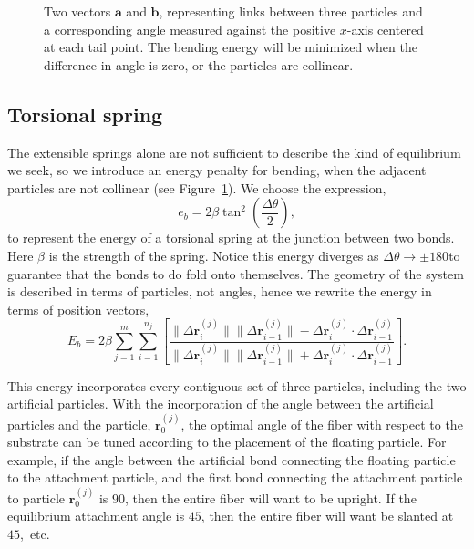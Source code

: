 	\begin{figure}
		\begin{center}
			
		\end{center}		
		\caption{Two vectors $\textbf{a}$ and $\textbf{b}$, representing links between three particles and a corresponding angle measured against the positive $x$-axis centered at each tail point. The bending energy will be minimized when the difference in angle is zero, or the particles are collinear.
		\label{fig:BendingEnergy}}
	\end{figure}	

\subsection{Torsional spring}

	The extensible springs alone are not sufficient to describe the kind of equilibrium we seek, so we introduce an energy penalty for bending, when the adjacent particles are not collinear (see Figure~\ref{fig:BendingEnergy}). We choose the expression,
\begin{equation}
	e_b = 2\beta \tan^2 \left( \frac{\Delta \theta}{2} \right),
\end{equation}
to represent the energy of a torsional spring at the junction between two bonds. Here $\beta$ is the strength of the spring. Notice this energy diverges as $\Delta \theta \to \pm180$\textdegree to guarantee that the bonds to do fold onto themselves. The geometry of the system is described in terms of particles, not angles, hence we rewrite the energy in terms of position vectors,
\begin{equation}
	E_b = 2\beta \sum_{j=1}^m \sum_{i=1}^{n_j} \left[ \frac{\|\Delta \textbf{r}_i^{(j)} \| \|\Delta \textbf{r}_{i-1}^{(j)} \| - \Delta \textbf{r}_i^{(j)} \cdot \Delta \textbf{r}_{i-1}^{(j)}}{\|\Delta \textbf{r}_i^{(j)} \| \|\Delta \textbf{r}_{i-1}^{(j)} \| + \Delta \textbf{r}_i^{(j)} \cdot \Delta \textbf{r}_{i-1}^{(j)}} \right].
\end{equation}

	This energy incorporates every contiguous set of three particles, including the two artificial particles. With the incorporation of the angle between the artificial particles and the particle, $\textbf{r}_0^{(j)}$, the optimal angle of the fiber with respect to the substrate can be tuned according to the placement of the floating particle. For example, if the angle between the artificial bond connecting the floating particle to the attachment particle, and the first bond connecting the attachment particle to particle $\textbf{r}_0^{(j)}$ is $90$\textdegree, then the entire fiber will want to be upright. If the equilibrium attachment angle is $45$\textdegree, then the entire fiber will want be slanted at $45$\textdegree,~etc. 

